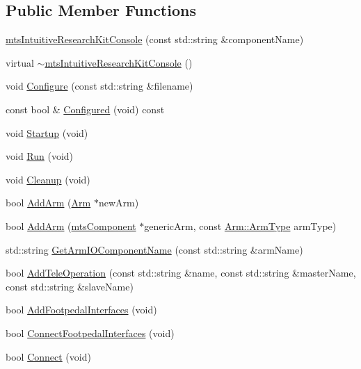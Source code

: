\subsection*{Public Member Functions}
\begin{DoxyCompactItemize}
\item 
\hyperlink{classmts_intuitive_research_kit_console_ac35e521263fc5019b4fe0d2540bc4688}{mts\-Intuitive\-Research\-Kit\-Console} (const std\-::string \&component\-Name)
\item 
virtual \hyperlink{classmts_intuitive_research_kit_console_ad4ccebcacb7c58f67408a320f7806087}{$\sim$mts\-Intuitive\-Research\-Kit\-Console} ()
\item 
void \hyperlink{classmts_intuitive_research_kit_console_a90bf83e404aee02af4cb057eb5e74db8}{Configure} (const std\-::string \&filename)
\item 
const bool \& \hyperlink{classmts_intuitive_research_kit_console_a62f7dd001cdf5c18ff2ecfaa99530f00}{Configured} (void) const 
\item 
void \hyperlink{classmts_intuitive_research_kit_console_a15a0d6dd7789ea68f27f431c02b7567d}{Startup} (void)
\item 
void \hyperlink{classmts_intuitive_research_kit_console_ad43239998cb5751d31491cdcf5330ba1}{Run} (void)
\item 
void \hyperlink{classmts_intuitive_research_kit_console_a7e2319e21dc925a67d43945abad7cf6b}{Cleanup} (void)
\item 
bool \hyperlink{classmts_intuitive_research_kit_console_a821d3521e2730d729d615c46ec5018cc}{Add\-Arm} (\hyperlink{classmts_intuitive_research_kit_console_1_1_arm}{Arm} $\ast$new\-Arm)
\item 
bool \hyperlink{classmts_intuitive_research_kit_console_a27e2a757cfc2e6420bdaf8bc4f0e7adf}{Add\-Arm} (\hyperlink{classmts_component}{mts\-Component} $\ast$generic\-Arm, const \hyperlink{classmts_intuitive_research_kit_console_1_1_arm_acb898ba65d323f59ffd0885a47ef6cec}{Arm\-::\-Arm\-Type} arm\-Type)
\item 
std\-::string \hyperlink{classmts_intuitive_research_kit_console_a6a9772ea46ce1c9d510542b7799762db}{Get\-Arm\-I\-O\-Component\-Name} (const std\-::string \&arm\-Name)
\item 
bool \hyperlink{classmts_intuitive_research_kit_console_af37c6ee3dfcccae503763302b7beae19}{Add\-Tele\-Operation} (const std\-::string \&name, const std\-::string \&master\-Name, const std\-::string \&slave\-Name)
\item 
bool \hyperlink{classmts_intuitive_research_kit_console_ae0b3435d4ed3b177bc8f40dbbb7d1b2a}{Add\-Footpedal\-Interfaces} (void)
\item 
bool \hyperlink{classmts_intuitive_research_kit_console_a258511d8703fe6515d7f86856890a863}{Connect\-Footpedal\-Interfaces} (void)
\item 
bool \hyperlink{classmts_intuitive_research_kit_console_ad3080360d310e78ca3e1faccdf4fb073}{Connect} (void)
\end{DoxyCompactItemize}
